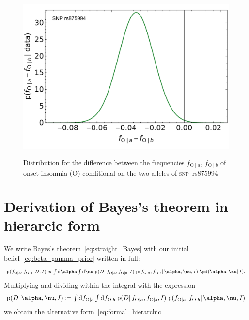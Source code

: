 \documentclass[\ifafour a4paper,12pt,\else a5paper,10pt,\fi%
onecolumn,oneside,article,%
british%
]{memoir}
\theoremstyle{remark}
\theoremstyle{innote}
\newcommand*{\di}{\mathrm{d}}%
\newcommand*{\defd}{\coloneqq}
\newcommand*{\pf}{\mathrm{p}}%
\renewcommand*{\|}{\mathpunct{|}}
\newcommand*{\tint}{\begingroup\textstyle\int\endgroup\nolimits}
\newcommand*{\snp}{\textsc{snp}}
\newcommand*{\yD}{D}
\newcommand*{\yI}{I}
\newcommand*{\ya}{a}
\newcommand*{\yb}{b}
\newcommand*{\ysA}{\textrm{O}}%
\newcommand*{\dbeta}{\betaup}
\newcommand*{\dA}{\pi}
\newcommand*{\yA}{\alpha}
\newcommand*{\yqq}{\nu}
\newcommand*{\yq}{\bm{\yqq}}
\begin{document}
\begin{figure}[b!]%
 \centering\includegraphics[width=0.75\linewidth]{difference_symA_snp6.pdf}\\
 \caption{Distribution for the difference between the frequencies
   $f_{\ysA\|\ya}$, $f_{\ysA\|\yb}$ of onset insomnia ($\ysA$) conditional on
   the two alleles of \snp\ rs875994}\label{fig:difference_distributions}
\end{figure}%

\newpage
\appendix


\section{Derivation of Bayes's theorem in hierarcic form}
\label{sec:bayes_hierarcic}

We write Bayes's theorem~\eqref{eq:straight_Bayes} with our initial
belief~\eqref{eq:beta_gamma_prior} written in full:
\begin{equation}
  \label{eq:straight_Bayes_full_prior}
  \pf(f_{\ysA\|\ya}, f_{\ysA\|\yb} \| \yD, \yI)
  \propto
  \tint\di\yA\tint\di\yq\;
    \pf(\yD \| f_{\ysA\|\ya}, f_{\ysA\|\yb} \| \yI)\;
 \pf(f_{\ysA\|\ya}, f_{\ysA\|\yb} \|\yA,\yq, \yI)\;
  \dA(\yA,\yq \|\yI).
\end{equation}
Multiplying and dividing within the integral with the expression
\begin{equation}
  \label{eq:def_Aq_given_data}
    \pf(\yD \|\yA,\yq,\yI)\defd
\tint\di f_{\ysA\|\ya}\tint\di f_{\ysA\|\yb}\;
  \pf(\yD \|f_{\ysA\|\ya}, f_{\ysA\|\yb}, \yI)\;
  \pf(f_{\ysA\|\ya}, f_{\ysA\|\yb}\| \yA,\yq,\yI)
\end{equation}
we obtain the alternative form~\eqref{eq:formal_hierarchic}
\end{document}

